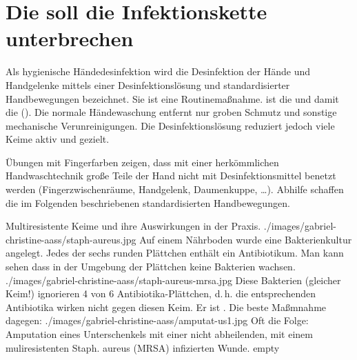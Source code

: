 \section{Die  soll die Infektionskette unterbrechen}
\label{topic:hygienische-haendedesinfektion}

\Text
{\TxBeschreibung}
{Als hygienische Händedesinfektion wird die Desinfektion der
Hände und Handgelenke mittels einer Desinfektionslösung und
standardisierter Handbewegungen bezeichnet. Sie ist eine
Routinemaßnahme.
 ist  die 
 und damit die  (). Die normale Händewaschung
        entfernt nur groben Schmutz und sonstige mechanische Verunreinigungen. Die
Desinfektionslösung reduziert jedoch viele
Keime aktiv und gezielt.

Übungen mit Fingerfarben
zeigen, dass mit einer herkömmlichen Handwaschtechnik große
Teile der Hand nicht mit Desinfektionsmittel
benetzt werden (Fingerzwischenräume,
Handgelenk, Daumenkuppe, \ldots). Abhilfe schaffen die im
Folgenden beschriebenen standardisierten Handbewegungen.}
{}
{}
{}
{}

\begin{Synopsis}
\end{Synopsis}



\begin{PictureSeriesWide}{}{ Multiresistente
Keime und ihre Auswirkungen in der Praxis. 
}
{./images/gabriel-christine-aass/staph-aureus.jpg}
{Auf einem Nährboden wurde eine Bakterienkultur angelegt.
Jedes der sechs runden Plättchen enthält ein Antibiotikum.
Man kann sehen dass in der Umgebung der Plättchen keine
Bakterien
wachsen.}
{./images/gabriel-christine-aass/staph-aureus-mrsa.jpg}
{Diese Bakterien (gleicher Keim!) ignorieren 4 von 6
Antibiotika-Plättchen, d.\,h. die entsprechenden Antibiotika wirken
nicht gegen diesen Keim. Er ist . Die
beste Maßmnahme dagegen: }
{./images/gabriel-christine-aass/amputat-us1.jpg}
{Oft die Folge: Amputation eines Unterschenkels mit einer nicht
abheilenden, mit einem muliresistenten
Staph. aureus (MRSA) infizierten Wunde.}
{empty}
{}
\end{PictureSeriesWide}


